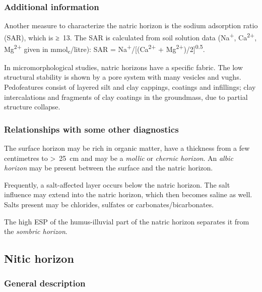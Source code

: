 \documentclass[
  letterpaper,
  DIV=11,
  numbers=noendperiod]{scrreprt}
\begin{document}
\hypertarget{additional-information-10}{%
\subsubsection{Additional information}\label{additional-information-10}}

Another measure to characterize the natric horizon is the sodium
adsorption ratio (SAR), which is ≥~13. The SAR is calculated from soil
solution data (Na\textsuperscript{+}, Ca\textsuperscript{2+},
Mg\textsuperscript{2+} given in mmol\textsubscript{c}/litre): SAR =
Na\textsuperscript{+}/{[}(Ca\textsuperscript{2+} +
Mg\textsuperscript{2+})/2{]}\textsuperscript{0.5}.

In micromorphological studies, natric horizons have a specific fabric.
The low structural stability is shown by a pore system with many
vesicles and vughs. Pedofeatures consist of layered silt and clay
cappings, coatings and infillings; clay intercalations and fragments of
clay coatings in the groundmass, due to partial structure collapse.

\hypertarget{relationships-with-some-other-diagnostics-20}{%
\subsubsection{Relationships with some other
diagnostics}\label{relationships-with-some-other-diagnostics-20}}

The surface horizon may be rich in organic matter, have a thickness from
a few centimetres to \textgreater~25~cm and may be a \emph{mollic} or
\emph{chernic horizon}. An \emph{albic horizon} may be present between
the surface and the natric horizon.

Frequently, a salt-affected layer occurs below the natric horizon. The
salt influence may extend into the natric horizon, which then becomes
saline as well. Salts present may be chlorides, sulfates or
carbonates/bicarbonates.

The high ESP of the humus-illuvial part of the natric horizon separates
it from the \emph{sombric horizon}.

\hypertarget{nitic-horizon}{%
\subsection{Nitic horizon}\label{nitic-horizon}}

\hypertarget{general-description-21}{%
\subsubsection{General description}\label{general-description-21}}
\end{document}
